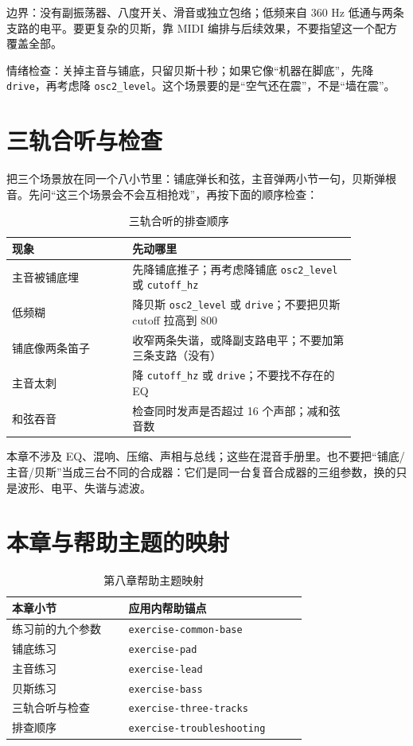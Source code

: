 边界：没有副振荡器、八度开关、滑音或独立包络；低频来自 360 Hz 低通与两条支路的电平。要更复杂的贝斯，靠 MIDI 编排与后续效果，不要指望这一个配方覆盖全部。

情绪检查：关掉主音与铺底，只留贝斯十秒；如果它像“机器在脚底”，先降 \texttt{drive}，再考虑降 \texttt{osc2\_level}。这个场景要的是“空气还在震”，不是“墙在震”。


\section{三轨合听与检查}

把三个场景放在同一个八小节里：铺底弹长和弦，主音弹两小节一句，贝斯弹根音。先问“这三个场景会不会互相抢戏”，再按下面的顺序检查：

\begin{table}[htbp]
\centering
\small
\begin{tabular}{@{}p{0.30\linewidth}p{0.56\linewidth}@{}}
\hline
现象 & 先动哪里 \\
\hline
主音被铺底埋 & 先降铺底推子；再考虑降铺底 \texttt{osc2\_level} 或 \texttt{cutoff\_hz} \\
低频糊 & 降贝斯 \texttt{osc2\_level} 或 \texttt{drive}；不要把贝斯 cutoff 拉高到 800 \\
铺底像两条笛子 & 收窄两条失谐，或降副支路电平；不要加第三条支路（没有） \\
主音太刺 & 降 \texttt{cutoff\_hz} 或 \texttt{drive}；不要找不存在的 EQ \\
和弦吞音 & 检查同时发声是否超过 16 个声部；减和弦音数 \\
\hline
\end{tabular}
\caption{三轨合听的排查顺序}
\label{tab:exercise-troubleshooting}
\end{table}

本章不涉及 EQ、混响、压缩、声相与总线；这些在混音手册里。也不要把“铺底/主音/贝斯”当成三台不同的合成器：它们是同一台复音合成器的三组参数，换的只是波形、电平、失谐与滤波。

\section{本章与帮助主题的映射}

\begin{table}[htbp]
\centering
\small
\begin{tabular}{@{}p{0.34\linewidth}p{0.52\linewidth}@{}}
\hline
本章小节 & 应用内帮助锚点 \\
\hline
练习前的九个参数 & \texttt{exercise-common-base} \\
铺底练习 & \texttt{exercise-pad} \\
主音练习 & \texttt{exercise-lead} \\
贝斯练习 & \texttt{exercise-bass} \\
三轨合听与检查 & \texttt{exercise-three-tracks} \\
排查顺序 & \texttt{exercise-troubleshooting} \\
\hline
\end{tabular}
\caption{第八章帮助主题映射}
\label{tab:exercise-help-map}
\end{table}

